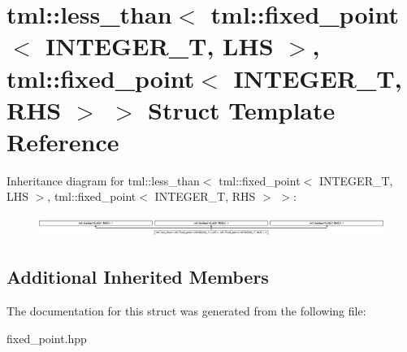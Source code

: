 \hypertarget{structtml_1_1less__than_3_01tml_1_1fixed__point_3_01INTEGER__T_00_01LHS_01_4_00_01tml_1_1fixed__059f280e23c8602e9ff1548fe7a86d14}{\section{tml\+:\+:less\+\_\+than$<$ tml\+:\+:fixed\+\_\+point$<$ I\+N\+T\+E\+G\+E\+R\+\_\+\+T, L\+H\+S $>$, tml\+:\+:fixed\+\_\+point$<$ I\+N\+T\+E\+G\+E\+R\+\_\+\+T, R\+H\+S $>$ $>$ Struct Template Reference}
\label{structtml_1_1less__than_3_01tml_1_1fixed__point_3_01INTEGER__T_00_01LHS_01_4_00_01tml_1_1fixed__059f280e23c8602e9ff1548fe7a86d14}
}
Inheritance diagram for tml\+:\+:less\+\_\+than$<$ tml\+:\+:fixed\+\_\+point$<$ I\+N\+T\+E\+G\+E\+R\+\_\+\+T, L\+H\+S $>$, tml\+:\+:fixed\+\_\+point$<$ I\+N\+T\+E\+G\+E\+R\+\_\+\+T, R\+H\+S $>$ $>$\+:\begin{figure}[H]
\begin{center}
\leavevmode
\includegraphics[height=0.693928cm]{structtml_1_1less__than_3_01tml_1_1fixed__point_3_01INTEGER__T_00_01LHS_01_4_00_01tml_1_1fixed__059f280e23c8602e9ff1548fe7a86d14}
\end{center}
\end{figure}
\subsection*{Additional Inherited Members}


The documentation for this struct was generated from the following file\+:\begin{DoxyCompactItemize}
\item 
fixed\+\_\+point.\+hpp\end{DoxyCompactItemize}
